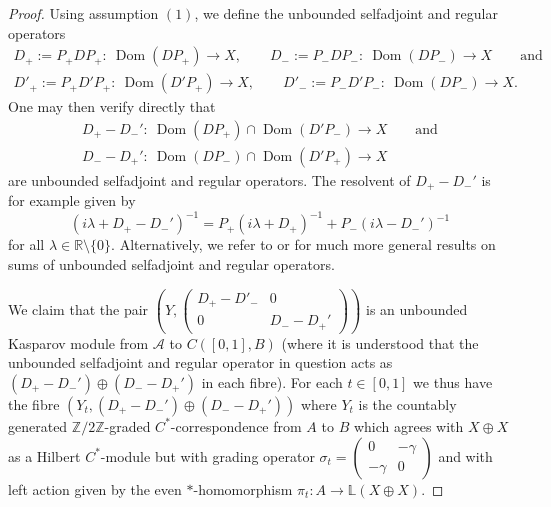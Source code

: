 \documentclass[11pt]{article}
\numberwithin{equation}{section}
\newcommand{\op}{\oplus}
\newcommand{\zz}{\mathbb{Z}}
\newcommand{\ga}{\gamma}
\newcommand{\la}{\lambda}
\newcommand{\si}{\sigma}
\newcommand{\s}[1]{\mathscr{#1}}
\newcommand{\B}[1]{\mathbb{#1}}
\newcommand{\sem}{\setminus}
\begin{document}
\begin{proof}
Using assumption $(1)$, we define the unbounded selfadjoint and regular operators
\begin{gather*}
D_+ := P_+ D P_+\colon \ \operatorname{Dom}(D P_+) \to X , \qquad D_- := P_- D P_-\colon \ \operatorname{Dom}(D P_-) \to X \qquad \text{and} \\
D'_+ := P_+ D' P_+\colon \ \operatorname{Dom}(D' P_+) \to X , \qquad D'_- := P_- D' P_-\colon \ \operatorname{Dom}(D P_-) \to X .
\end{gather*}
One may then verify directly that
\begin{gather*}
 D_+ - D_-'\colon \ \operatorname{Dom}(D P_+) \cap \operatorname{Dom}(D' P_-) \to X \qquad \text{and} \\
 D_- - D_+'\colon \ \operatorname{Dom}(D P_-) \cap \operatorname{Dom}(D' P_+) \to X
\end{gather*}
are unbounded selfadjoint and regular operators. The resolvent of $D_+ - D_-'$ is for example given by
\[
(i \la + D_+ - D_-')^{-1} = P_+ ( i \la + D_+)^{-1} + P_- (i\la - D_-')^{-1}
\]
for all $\la \in \B R \sem \{0\}$. Alternatively, we refer to \cite[Section~7]{KaLe:LGR} or \cite[Theorem~4.5]{LeMe:SSH} for much more general results on sums of unbounded selfadjoint and regular operators.

We claim that the pair $\left(Y, \left(\begin{smallmatrix} D_+ - D'_- & 0 \\ 0 & D_- - D_+' \end{smallmatrix}\right)\right)$ is an unbounded Kasparov module from $\s A$ to $C( [0,1], B)$ (where it is understood that the unbounded selfadjoint and regular operator in question acts as $( D_+ - D_-') \op (D_- - D_+')$ in each fibre). For each $t \in [0,1]$ we thus have the fibre $(Y_t, ( D_+ - D_-') \op (D_- - D_+'))$ where $Y_t$ is the countably generated $\zz/2\zz$-graded $C^*$-correspondence from $A$ to $B$ which agrees with $X \op X$ as a Hilbert $C^*$-module but with grading operator $\si_t = \left(\begin{smallmatrix}0 & -\ga \\ -\ga & 0\end{smallmatrix}\right)$ and with left action given by the even $*$-homomorphism $\pi_t\colon A \to \B L(X \op X)$.


\end{proof}
\end{document}

